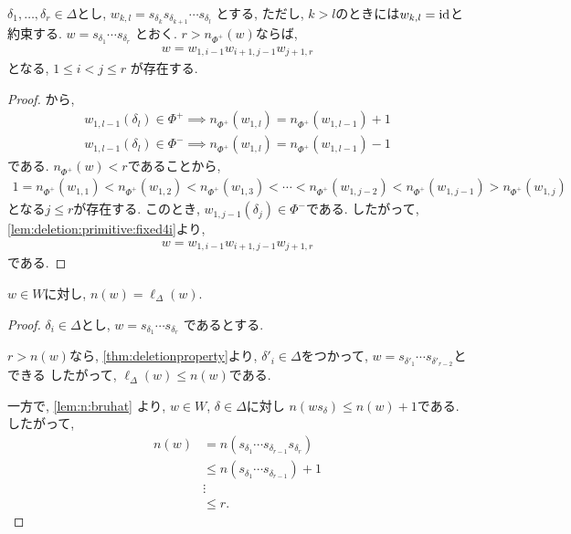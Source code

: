 \begin{prop}
  \label{thm:deletionproperty}
  $\delta_1,\ldots,\delta_r \in\Delta$とし,
  $w_{k,l}=s_{\delta_k}s_{\delta_{k+1}}\cdots s_{\delta_l}$
  とする, ただし, $k>l$のときには$w_{k,l}=\operatorname{id}$と約束する.
  $w=s_{\delta_1}\cdots s_{\delta_r}$
  とおく.
  $r>n_{\Phi^+}(w)$ならば,
  \begin{align*}
    w=w_{1,i-1}w_{i+1,j-1}w_{j+1,r}
  \end{align*}  
  となる, $1\leq i < j \leq r$
  が存在する.
\end{prop}

\begin{proof}
  から,
  \begin{align*}
    w_{1,l-1}(\delta_{l})\in\Phi^+ \implies n_{\Phi^+}(w_{1,l})=n_{\Phi^+}(w_{1,l-1})+1\\
    w_{1,l-1}(\delta_{l})\in\Phi^- \implies n_{\Phi^+}(w_{1,l})=n_{\Phi^+}(w_{1,l-1})-1
  \end{align*}
  である.  $n_{\Phi^+}(w)<r$であることから,
  \begin{align*}
    1=n_{\Phi^+}(w_{1,1})<n_{\Phi^+}(w_{1,2})<n_{\Phi^+}(w_{1,3})<\cdots<n_{\Phi^+}(w_{1,j-2})<n_{\Phi^+}(w_{1,j-1})>n_{\Phi^+}(w_{1,j})
  \end{align*}
  となる$j\leq r$が存在する.
  このとき, $w_{1,j-1}(\delta_{j})\in\Phi^-$である.
  したがって,
  \cref{lem:deletion:primitive:fixed4i}より,
  \begin{align*}
    w=w_{1,i-1}w_{i+1,j-1}w_{j+1,r}
  \end{align*}
  である.
  
\end{proof}

\begin{cor}
  \label{prop:n=l}
  $w\in W$に対し, $n(w)=\ell_\Delta(w)$.
\end{cor}
\begin{proof}
  $\delta_i\in\Delta$とし,
  $w=s_{\delta_1}\cdots s_{\delta_r}$
  であるとする.

  $r>n(w)$なら,
  \cref{thm:deletionproperty}より,  
  $\delta'_i\in\Delta$をつかって,
  $w=s_{\delta'_1}\cdots s_{\delta'_{r-2}}$とできる
  したがって, $\ell_\Delta(w) \leq n(w)$である.

  一方で,
  \cref{lem:n:bruhat}
  より,
  $w\in W$, $\delta\in \Delta$に対し
  $n(ws_\delta)\leq n(w)+1$である.
  したがって,
  \begin{align*}
    n(w)&=n(s_{\delta_1}\cdots s_{\delta_{r-1}}s_{\delta_r})\\
    &\leq n(s_{\delta_1}\cdots s_{\delta_{r-1}})+1\\
    &\vdots\\
    &\leq r.
  \end{align*}
  
\end{proof}


